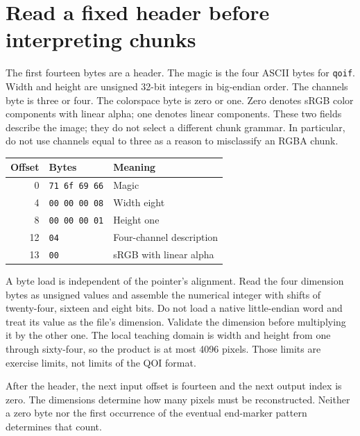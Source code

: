 \section{Read a fixed header before interpreting chunks}
The first fourteen bytes are a header. The magic is the four ASCII bytes for
\texttt{qoif}. Width and height are unsigned 32-bit integers in big-endian order.
The channels byte is three or four. The colorspace byte is zero or one. Zero denotes
sRGB color components with linear alpha; one denotes linear components. These two
fields describe the image; they do not select a different chunk grammar. In particular,
do not use channels equal to three as a reason to misclassify an RGBA chunk.

\begin{center}
  \begin{tabular}{rll}
    Offset & Bytes                & Meaning                  \\
    \hline
    0      & \texttt{71 6f 69 66} & Magic                    \\
    4      & \texttt{00 00 00 08} & Width eight              \\
    8      & \texttt{00 00 00 01} & Height one               \\
    12     & \texttt{04}          & Four-channel description \\
    13     & \texttt{00}          & sRGB with linear alpha   \\
  \end{tabular}
\end{center}

A byte load is independent of the pointer's alignment. Read the four dimension bytes
as unsigned values and assemble the numerical integer with shifts of twenty-four,
sixteen and eight bits. Do not load a native little-endian word and treat its value
as the file's dimension. Validate the dimension before multiplying it by the other
one. The local teaching domain is width and height from one through sixty-four, so
the product is at most 4096 pixels. Those limits are exercise limits, not limits of
the QOI format.

After the header, the next input offset is fourteen and the next output index is zero.
The dimensions determine how many pixels must be reconstructed. Neither a zero byte
nor the first occurrence of the eventual end-marker pattern determines that count.
